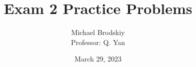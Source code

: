 


\usepackage[dvipsnames,table]{xcolor}
\usepackage{siunitx} %
\usepackage{pgfplots}

\title{Exam 2 Practice Problems}
\date{March 29, 2023}
\author{Michael Brodskiy\\ \small Professor: Q. Yan}



\maketitle

\newpage

